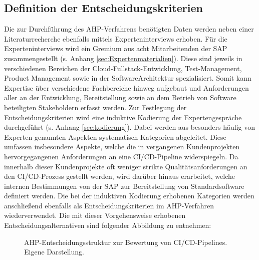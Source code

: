 \subsection{Definition der Entscheidungskriterien}
 Die zur Durchführung des AHP-Verfahrens benötigten Daten werden neben einer Literaturrecherche ebenfalls mittels Experteninterviews erhoben. Für die Experteninterviews wird ein Gremium aus acht Mitarbeitenden der SAP zusammengestellt (s. Anhang \ref{sec:Expertenmaterialien}). Diese sind jeweils in verschiedenen Bereichen der Cloud-Fullstack-Entwicklung, Test-Management, Product Management sowie in der Software\-Architektur spezialisiert. Somit kann Expertise über verschiedene Fachbereiche hinweg aufgebaut und Anforderungen aller an der Entwicklung, Bereitstellung sowie an dem Betrieb von Software beteiligten Stakeholdern erfasst werden. Zur Festlegung der Entscheidungskriterien wird eine induktive Kodierung der Expertengespräche durchgeführt (s. Anhang \ref{sec:kodierung}). Dabei werden aus besonders häufig von Experten genannten Aspekten systematisch Kategorien abgeleitet. Diese umfassen insbesondere Aspekte, welche die in vergangenen Kundenprojekten hervorgegangenen Anforderungen an eine CI/CD-Pipeline widerspiegeln. Da innerhalb dieser Kundenprojekte oft weniger strikte Qualitätsanforderungen an den CI/CD-Prozess gestellt werden, wird darüber hinaus erarbeitet, welche internen Bestimmungen von der SAP zur Bereitstellung von Standardsoftware definiert werden. Die bei der induktiven Kodierung erhobenen Kategorien werden anschließend ebenfalls als Entscheidungskriterien im AHP-Verfahren wiederverwendet. Die mit dieser Vorgehensweise erhobenen Entscheidungsalternativen sind folgender Abbildung zu entnehmen:
 \begin{center}
	\begin{figure}[H]
		\centering
		\caption[AHP-Entscheidungsstruktur zur Bewertung von CI/CD-Pipelines]{AHP-Entscheidungsstruktur zur Bewertung von CI/CD-Pipelines. Eigene Darstellung.}
		\label{fig:AHP_E}
	\end{figure}
\end{center}
\vspace*{-15mm}
